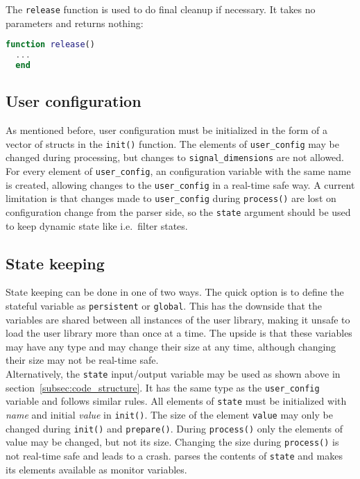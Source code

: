 \documentclass[11pt,a4paper,twoside]{article}
\newcommand{\+}{\discretionary{\mbox{\scriptsize$\hookleftarrow$}}{}{}}
\begin{document}
The \texttt{release} function is used to do final cleanup if necessary.
It takes no parameters and returns nothing:
\begin{lstlisting}[language=Matlab]
  function release()
  ...
  end
\end{lstlisting}
\subsection{User configuration}
As mentioned before, user configuration must be initialized in the form of a
vector of structs in the \texttt{init()} function.
The elements of \texttt{user\_config} may be changed during processing,
but changes to \texttt{signal\_dimensions} are not allowed. 
For every element of \texttt{user\_config}, an \mha{} configuration variable
with the same name is created, allowing changes to the \texttt{user\_config} in
a real-time safe way.
A current limitation is that changes made to \texttt{user\_config} during \texttt{process()} are
lost on configuration change from the parser side, so the \texttt{state}
argument should be used to keep dynamic state like i.e.\ filter states.
\subsection{State keeping}
State keeping can be done in one of two ways. The quick option is to define the
stateful variable as \texttt{persistent} or \texttt{global}. This has the
downside that the variables are shared between all instances of the user
library, making it unsafe to load the user library more than once at a time.
The upside is that these variables may have any type and may change their size
at any time, although changing their size may not be real-time safe. \\
Alternatively, the \texttt{state} input/output variable may be used as shown above in section~\ref{subsec:code_structure}.
It has the same type as the \texttt{user\_config} variable and follows similar rules.
All elements of \texttt{state} must be initialized with \emph{name} and initial \emph{value}
in \texttt{init()}. The size of the element \texttt{value} may only be changed
during \texttt{init()} and \texttt{prepare()}. During \texttt{process()} only
the elements of value may be changed, but not its size. Changing the size during
\texttt{process()} is not real-time safe and leads to a crash. \mha{} parses the
contents of \texttt{state} and makes its elements available as monitor variables.
\end{document}
